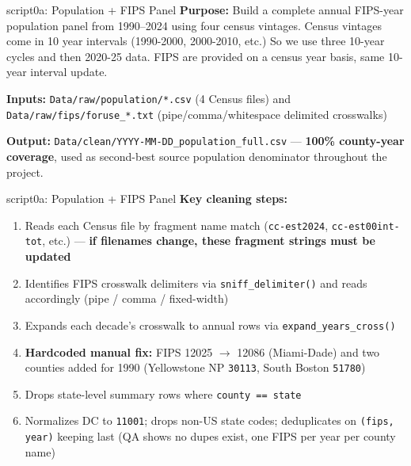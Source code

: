\documentclass[aspectratio=169]{beamer}
\begin{document}

\begin{frame}{script0a: Population + FIPS Panel}\label{0a}
\textbf{Purpose:} Build a complete annual FIPS-year population panel from 1990--2024 using four census vintages. Census vintages come in 10 year intervals (1990-2000, 2000-2010, etc.) So we use three 10-year cycles and then 2020-25 data. FIPS are provided on a census year basis, same 10-year interval update. 

\vspace{0.5em}
\textbf{Inputs:} \texttt{Data/raw/population/*.csv} (4 Census files) and \texttt{Data/raw/fips/foruse\_*.txt} (pipe/comma/whitespace delimited crosswalks)

\vspace{0.3em}
\textbf{Output:} \texttt{Data/clean/YYYY-MM-DD\_population\_full.csv} — \textbf{100\% county-year coverage}, used as second-best source population denominator throughout the project.

\end{frame}

\begin{frame}{script0a: Population + FIPS Panel}
\vspace{0.5em}
\textbf{Key cleaning steps:}
\begin{enumerate}\small
    \item Reads each Census file by fragment name match (\texttt{cc-est2024}, \texttt{cc-est00int-tot}, etc.) — \textbf{if filenames change, these fragment strings must be updated}
    \item Identifies FIPS crosswalk delimiters via \texttt{sniff\_delimiter()} and reads accordingly (pipe / comma / fixed-width)
    \item Expands each decade's crosswalk to annual rows via \texttt{expand\_years\_cross()}
    \item \textbf{Hardcoded manual fix:} FIPS 12025 $\rightarrow$ 12086 (Miami-Dade) and two counties added for 1990 (Yellowstone NP \texttt{30113}, South Boston \texttt{51780})
    \item Drops state-level summary rows where \texttt{county == state}
    \item Normalizes DC to \texttt{11001}; drops non-US state codes; deduplicates on \texttt{(fips, year)} keeping last (QA shows no dupes exist, one FIPS per year per county name)
\end{enumerate}
\end{frame}
\end{document}
